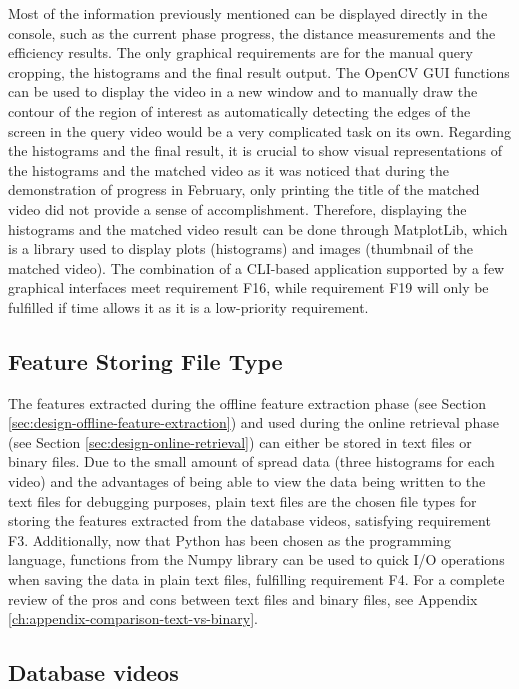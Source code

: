 Most of the information previously mentioned can be displayed directly in the console, such as the current phase progress, the distance measurements and the efficiency results. The only graphical requirements are for the manual query cropping, the histograms and the final result output. The OpenCV GUI functions can be used to display the video in a new window and to manually draw the contour of the region of interest as automatically detecting the edges of the screen in the query video would be a very complicated task on its own. Regarding the histograms and the final result, it is crucial to show visual representations of the histograms and the matched video as it was noticed that during the demonstration of progress in February, only printing the title of the matched video did not provide a sense of accomplishment. Therefore, displaying the histograms and the matched video result can be done through MatplotLib, which is a library used to display plots (histograms) and images (thumbnail of the matched video). The combination of a CLI-based application supported by a few graphical interfaces meet requirement F16, while requirement F19 will only be fulfilled if time allows it as it is a low-priority requirement.

\subsection{Feature Storing File Type}
\label{sec:design-feature-storing-file-type}

The features extracted during the offline feature extraction phase (see Section \ref{sec:design-offline-feature-extraction}) and used during the online retrieval phase (see Section \ref{sec:design-online-retrieval}) can either be stored in text files or binary files. Due to the small amount of spread data (three histograms for each video) and the advantages of being able to view the data being written to the text files for debugging purposes, plain text files are the chosen file types for storing the features extracted from the database videos, satisfying requirement F3. Additionally, now that Python has been chosen as the programming language, functions from the Numpy library can be used to quick I/O operations when saving the data in plain text files, fulfilling requirement F4. For a complete review of the pros and cons between text files and binary files, see Appendix \ref{ch:appendix-comparison-text-vs-binary}.\\

\subsection{Database videos}

